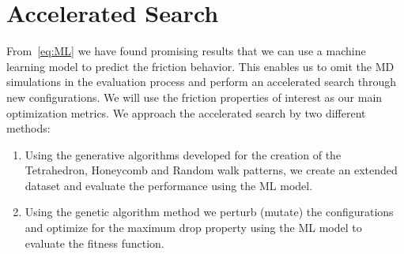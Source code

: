 \section{Accelerated Search}
From~\cref{eq:ML} we have found promising results that we can use a machine learning model to predict the friction behavior. This enables us to omit the \acrshort{MD} simulations in the evaluation process and perform an accelerated search through new configurations. We will use the friction properties of interest as our main optimization metrics. We approach the accelerated search by two different methods:
\begin{enumerate}
  \item Using the generative algorithms developed for the creation of the Tetrahedron, Honeycomb and Random walk patterns, we create an extended dataset and evaluate the performance using the \acrshort{ML} model.
  \item Using the genetic algorithm method we perturb (mutate) the configurations and optimize for the maximum drop property using the \acrshort{ML} model to evaluate the fitness function. 
\end{enumerate}


